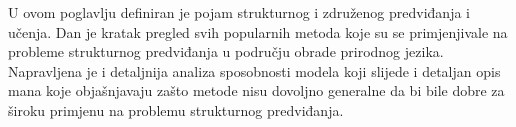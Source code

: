 U ovom poglavlju definiran je pojam strukturnog i združenog predviđanja i
učenja. Dan je kratak pregled svih popularnih metoda koje su se primjenjivale na
probleme strukturnog predviđanja u području obrade prirodnog jezika. Napravljena
je i detaljnija analiza sposobnosti modela koji slijede i detaljan opis mana
koje objašnjavaju zašto metode nisu dovoljno generalne da bi bile dobre za
široku primjenu na problemu strukturnog predviđanja.
